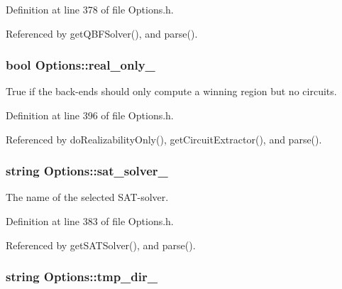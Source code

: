 Definition at line 378 of file Options.\-h.



Referenced by get\-Q\-B\-F\-Solver(), and parse().

\hypertarget{classOptions_a2e3668079f6c62e087edd486d19bf84a}{
\subsubsection[{real\-\_\-only\-\_\-}]{\setlength{\rightskip}{0pt plus 5cm}bool Options\-::real\-\_\-only\-\_\-\hspace{0.3cm}{\ttfamily [protected]}}}\label{classOptions_a2e3668079f6c62e087edd486d19bf84a}


True if the back-\/ends should only compute a winning region but no circuits. 



Definition at line 396 of file Options.\-h.



Referenced by do\-Realizability\-Only(), get\-Circuit\-Extractor(), and parse().

\hypertarget{classOptions_af68f26928f23fda3bdc75c4b43ae17bc}{
\subsubsection[{sat\-\_\-solver\-\_\-}]{\setlength{\rightskip}{0pt plus 5cm}string Options\-::sat\-\_\-solver\-\_\-\hspace{0.3cm}{\ttfamily [protected]}}}\label{classOptions_af68f26928f23fda3bdc75c4b43ae17bc}


The name of the selected S\-A\-T-\/solver. 



Definition at line 383 of file Options.\-h.



Referenced by get\-S\-A\-T\-Solver(), and parse().

\hypertarget{classOptions_a9428fdd0bd5f4f256c18a4d7db9c0647}{
\subsubsection[{tmp\-\_\-dir\-\_\-}]{\setlength{\rightskip}{0pt plus 5cm}string Options\-::tmp\-\_\-dir\-\_\-\hspace{0.3cm}{\ttfamily [protected]}}}\label{classOptions_a9428fdd0bd5f4f256c18a4d7db9c0647}


